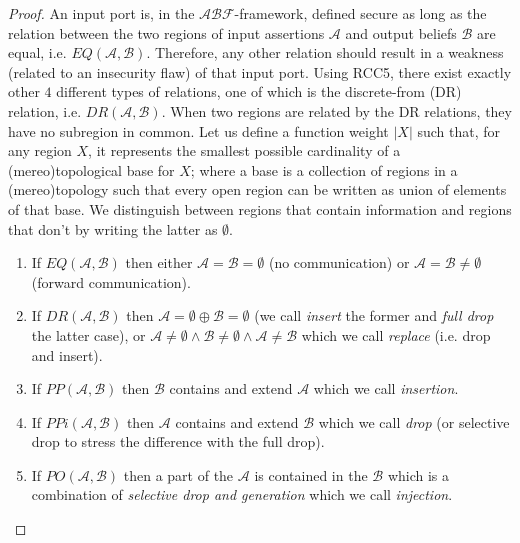 \documentclass[conference]{IEEEtran}
\newcommand{\assertionRegion}{\mathcal{A}}
\newcommand{\beliefRegion}{\mathcal{B}}
\newcommand{\factRegion}{\mathcal{F}}
\newcommand{\abftheory}{\assertionRegion\beliefRegion\factRegion}
\newcommand{\eq}[2]{EQ(#1,#2)}
\newcommand{\pp}[2]{PP(#1,#2)}
\newcommand{\po}[2]{PO(#1,#2)}
\newcommand{\ppi}[2]{PPi(#1,#2)}
\newcommand{\dr}[2]{DR(#1,#2)}
\begin{document}
\begin{proof}
An input port is, in the $\abftheory$-framework, defined secure as long as the relation
	between the two regions of input assertions $\assertionRegion$ and
	output beliefs $\beliefRegion$ are equal, i.e.
	$\eq{\assertionRegion}{\beliefRegion}$. Therefore, any other relation
	should result in a weakness (related to an insecurity flaw) of that
	input port.  Using RCC5, there exist exactly other $4$ different types
	of relations, one of which is the discrete-from (DR) relation, i.e.
	$\dr{\assertionRegion}{\beliefRegion}$. When two regions are related by
	the DR relations, they have no subregion in common. Let us
	define a function weight $|X|$ such that, for any region $X$, it
	represents the smallest possible cardinality of a (mereo)topological base for
	$X$; where a base is a collection of regions in a (mereo)topology such that
	every open region can be written as union of elements of that base. 
	We distinguish between regions that contain information and regions that
	don't by writing the latter as $\emptyset$.
	\begin{enumerate}
		\item If $\eq{\assertionRegion}{\beliefRegion}$ then either
			$\assertionRegion=\beliefRegion=\emptyset$ (no
			communication) or
			$\assertionRegion=\beliefRegion\neq\emptyset$ (forward
			communication).
		\item If $\dr{\assertionRegion}{\beliefRegion}$ then
			$\assertionRegion=\emptyset\oplus\beliefRegion=\emptyset$
			(we call \emph{insert} the former and \emph{full drop}
			the latter case), or
			$\assertionRegion\neq\emptyset\wedge\beliefRegion\neq\emptyset\wedge\assertionRegion\neq\beliefRegion$
			which we call \emph{replace} (i.e. drop and insert).
		\item If $\pp{\assertionRegion}{\beliefRegion}$ then
			$\beliefRegion$ contains and extend $\assertionRegion$
			which we call \emph{insertion}.
		\item If $\ppi{\assertionRegion}{\beliefRegion}$ then
			$\assertionRegion$ contains and extend $\beliefRegion$
			which we call \emph{drop} (or selective drop to stress the difference with the full drop).
		\item If $\po{\assertionRegion}{\beliefRegion}$ then a part of
			the $\assertionRegion$ is contained in the
			$\beliefRegion$ which is a combination of
			\emph{selective drop and generation} which we call \emph{injection}.
	\end{enumerate}
\end{proof}
\end{document}
